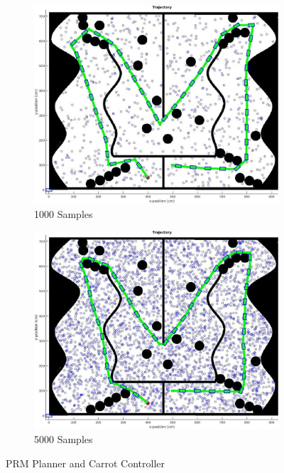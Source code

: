 \documentclass{article}
\begin{document}
\begin{figure}[H]
	\begin{subfigure}[b]{0.49\linewidth}
		\centering
		\includegraphics[width=\textwidth]{images/prm_1000.jpg}
		\caption{1000 Samples}
	\end{subfigure}
	\begin{subfigure}[b]{0.49\linewidth}
		\centering
		\includegraphics[width=\textwidth]{images/prm_5000.jpg}
		\caption{5000 Samples}
	\end{subfigure}
	\caption{PRM Planner and Carrot Controller}
	\label{fig:prm}
\end{figure}
\end{document}
